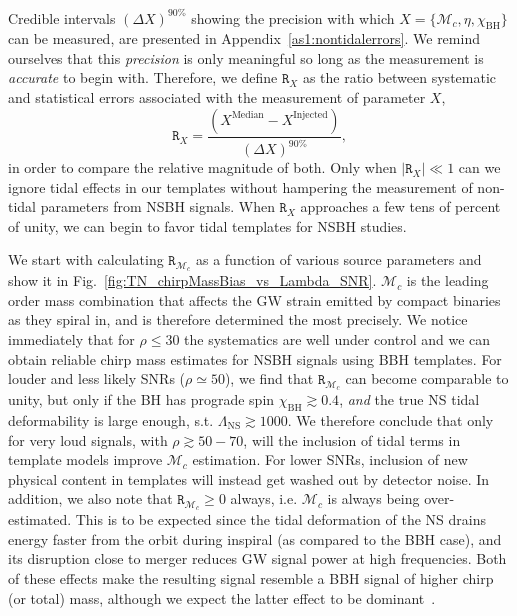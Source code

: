 \documentclass[aps,prd,amsmath,floats,floatfix, twocolumn,
superscriptaddress,nofootinbib,showpacs]{revtex4-1}
\newcommand{\lambdans}{\Lambda_\mathrm{NS}}
\newcommand{\chibh}{\chi_\mathrm{BH}}
\newcommand{\mchirp}{\mathcal{M}_c}
\newcommand{\arr}{\mathtt{R}}
\begin{document}
Credible intervals $(\Delta X)^{90\%}$ showing the precision with which
$X=\{\mchirp,\eta,\chibh\}$ can be measured, are presented in
Appendix~\ref{as1:nontidalerrors}.
We remind ourselves that this {\it precision} is only meaningful so long as the
measurement is {\it accurate} to begin with. Therefore, we define $\arr_X$ as
the ratio between systematic and statistical errors associated with the
measurement of parameter $X$,
\begin{equation}\label{eq:arr}
\arr_X = \dfrac{(X^\mathrm{Median} - X^\mathrm{Injected})}{(\Delta X)^{90\%}},
\end{equation}
in order to compare the relative magnitude of both. Only when
$|\arr_X| \ll 1$ can we ignore tidal effects in our templates
without hampering the measurement of non-tidal parameters from NSBH signals.
When $\arr_X$ approaches a few tens of percent of unity, we can begin to favor
tidal templates for NSBH studies.


We start with calculating $\arr_{\mchirp}$ as a function of various source
parameters and show it in Fig.~\ref{fig:TN_chirpMassBias_vs_Lambda_SNR}.
$\mchirp$ is the leading order
mass combination that affects the GW strain emitted by compact binaries as they
spiral in, and is therefore determined the most precisely. We notice
immediately that for $\rho\leq 30$ the systematics are well under control
and we can obtain reliable chirp mass estimates for NSBH signals using BBH
templates.
% 
For louder and less likely SNRs ($\rho\simeq 50$), we find that
$\arr_{\mchirp}$ can become comparable to unity, but only if the BH has
prograde spin $\chibh\gtrsim 0.4$, {\it and} the true NS tidal deformability
is large enough, s.t. $\lambdans \gtrsim 1000$.
% 
We therefore conclude that only for very loud signals, with
$\rho\gtrsim 50-70$, will the inclusion of tidal terms in template
models improve $\mchirp$ estimation. For lower SNRs, inclusion of new
physical content in templates will instead get washed out by detector noise.
% 
In addition, we also note that $\arr_{\mchirp}\geq 0$ always,
i.e. $\mchirp$ is always being over-estimated. This is to be expected since
the tidal deformation of the NS drains energy faster from the orbit during
inspiral (as compared to the BBH case), and its disruption close to merger
reduces GW signal power at high frequencies. Both of these effects make the
resulting signal resemble a BBH signal of higher chirp (or total) mass, although
we expect the latter effect to be dominant~\cite{Pannarale:2011pk}.
\end{document}

